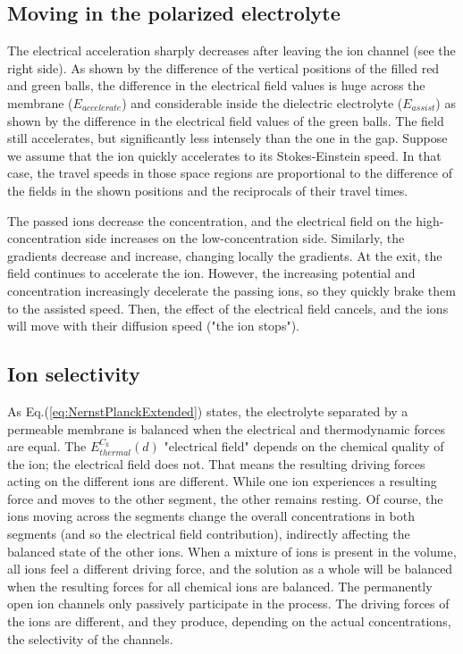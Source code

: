 \subsection{Moving in the polarized electrolyte\label{sec:Physics-MovingPolarized}}

The electrical acceleration sharply decreases after leaving the ion channel (see the right side). As shown by the difference of the vertical positions of the filled red and green balls, the difference in the electrical field values is huge across the membrane ($E_{accelerate}$) and considerable inside the dielectric
electrolyte ($E_{assist}$) as shown by the difference in the electrical field values of the green balls. The field still accelerates, but significantly less intensely than the one in the gap. Suppose we assume that the ion quickly accelerates to its Stokes-Einstein speed. In that case, the travel speeds in
those space regions are proportional to the difference of the fields
in the shown positions and the reciprocals of their travel times. 

The passed ions decrease the concentration, and the electrical field
on the high-concentration side increases on the low-concentration side. Similarly, the gradients decrease and increase,
changing locally the gradients.
At the exit, the field continues to accelerate the ion. 
However, the increasing potential and concentration 
increasingly decelerate the passing ions, so they quickly brake them to the assisted speed. Then, the effect of the electrical field cancels, and the ions will move with their diffusion speed ("the ion stops").




\subsection{Ion selectivity\label{sec:Physics-IonSelectivity}}
As Eq.(\ref{eq:NernstPlanckExtended}) states, the electrolyte separated by a permeable membrane is balanced when the electrical and thermodynamic forces are equal. The $E_{thermal}^{C_k}(d)$ "electrical field" depends on the chemical quality of the ion; the electrical field does not. That means the resulting driving forces acting on the
different ions are different. While one ion experiences a resulting force and moves to the other segment, the other remains resting. Of course, the ions moving across the segments change the overall concentrations in both segments (and so the electrical field contribution), indirectly affecting the balanced state of the other ions. When a mixture of ions is present in the volume,
all ions feel a different driving force, and the solution as a whole will be balanced when the resulting forces for all chemical ions are balanced. The permanently open ion channels only passively participate in the process. The driving forces of the ions are different, and they produce, depending on the actual concentrations, the selectivity of the channels. 

